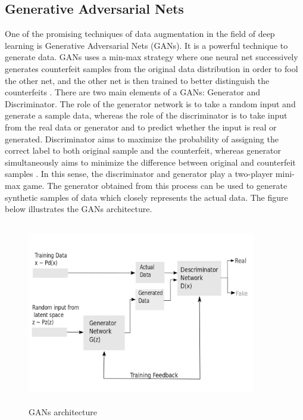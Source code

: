 \subsection{Generative Adversarial Nets}
One of the promising techniques of data augmentation in the field of deep learning is Generative Adversarial Nets (GANs). It is a powerful technique to generate data. GANs uses a min-max strategy where one neural net successively generates counterfeit samples from the original data distribution in order to fool the other net, and the other net is then trained to better distinguish the counterfeits \citep{goodfellow2014generative}. There are two main elements of a GANs: Generator and Discriminator. The role of the generator network is to take a random input and generate a sample data, whereas the role of the discriminator is to take input from the real data or generator and to predict whether the input is real or generated. Discriminator aims to maximize the probability of assigning the correct label to both original sample and the counterfeit, whereas generator simultaneously aims to minimize the difference between original and counterfeit samples \citep{goodfellow2014generative}. In this sense, the discriminator and generator play a two-player mini-max game. The generator obtained from this process can be used to generate synthetic samples of data which closely represents the actual data. The figure below illustrates the GANs architecture.

\begin{figure}[ht]
	\begin{center}
		\includegraphics[width=10cm,height=8cm,keepaspectratio]{images/GAN_2.png}
		\caption{GANs architecture}
		\label{fig:GAN}
	\end{center}
\end{figure} 

